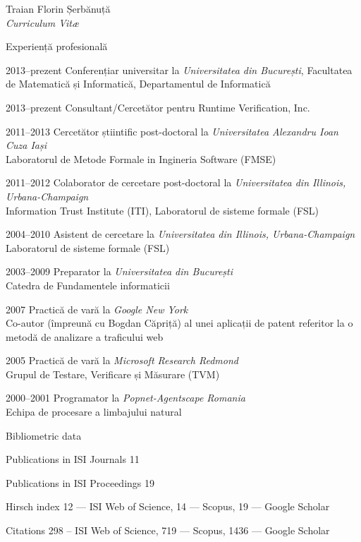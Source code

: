 \documentclass[10pt, romanian]{article}
\begin{document}
\begin{cv}{Traian Florin Șerbănuță\\{\large \itshape Curriculum Vit\ae}}
\begin{cvlist}{Experiență profesională}
    \item[2013--prezent] Conferențiar universitar la {\em Universitatea din București}, Facultatea de Matematică și Informatică, Departamentul de Informatică
    \item[2013--prezent] Consultant/Cercetător pentru Runtime Verification, Inc.
    \item[2011--2013] Cercetător știintific post-doctoral la {\em Universitatea Alexandru Ioan Cuza Iași}\\
    Laboratorul de Metode Formale in Ingineria Software (FMSE)
    \item[2011--2012] Colaborator de cercetare post-doctoral la {\em Universitatea din Illinois, Urbana-Champaign}\\
    Information Trust Institute (ITI), Laboratorul de sisteme formale (FSL)
    \item[2004--2010] Asistent de cercetare la {\em Universitatea din Illinois,
    Urbana-Champaign}\\
    Laboratorul de sisteme formale (FSL)
    \item[2003--2009] Preparator la {\em Universitatea din București}\\
     Catedra de Fundamentele informaticii
     \item[2007] Practică de vară la {\em Google New York}\\
     Co-autor (împreună cu Bogdan Căpriță) al unei aplicații de patent referitor la o metodă de analizare a traficului web
     \item[2005] Practică de vară la {\em Microsoft Research Redmond}\\
     Grupul de Testare, Verificare și Măsurare (TVM)
     \item[2000--2001] Programator la {\em Popnet-Agentscape Romania}\\
     Echipa de procesare a limbajului natural
\end{cvlist}


  \begin{cvlist}{Bibliometric data}
  \item[Publications in ISI Journals] 11
  \item[Publications in ISI Proceedings] 19
  \item[Hirsch index] 12 --- ISI Web of Science, 14 --- Scopus, 19 --- Google Scholar
  \item[Citations] 298 -- ISI Web of Science, 719 --- Scopus, 1436 --- Google Scholar
  \end{cvlist}




\end{cv}
\end{document}
